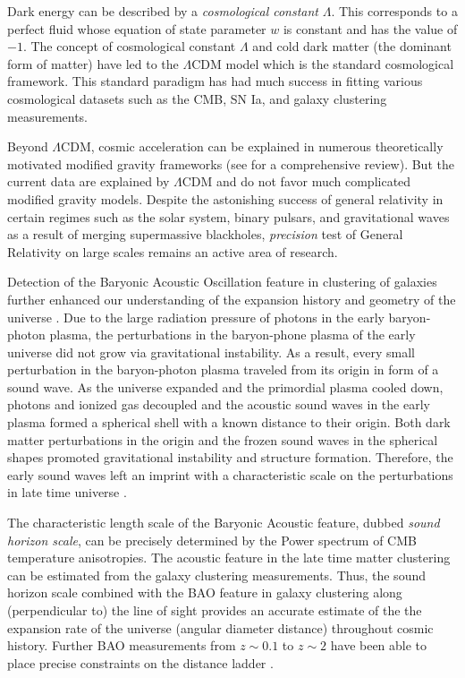 Dark energy can be described by a \emph{cosmological constant} $\Lambda$. 
This corresponds to a perfect fluid whose equation of state parameter $w$ is 
constant and has the value of $-1$. The concept of cosmological constant $\Lambda$ and 
cold dark matter (the dominant form of matter) have led to the $\Lambda$CDM model which is 
the standard cosmological framework. This standard paradigm has had much success in 
fitting various cosmological datasets such as the CMB, SN Ia, and galaxy clustering 
measurements.

Beyond $\Lambda$CDM, cosmic acceleration 
can be explained in numerous theoretically motivated modified gravity frameworks (see \citealt{bull2016} 
for a comprehensive review). But the current data are explained by $\Lambda$CDM and do not favor 
much complicated modified gravity models. 
Despite the astonishing success of general relativity in 
certain regimes such as the solar system, binary pulsars, 
and gravitational waves as a result of merging supermassive blackholes, 
\emph{precision} test of General Relativity on large scales remains an active area of research. 

Detection of the Baryonic Acoustic Oscillation feature in clustering of galaxies 
further enhanced our understanding of the expansion history and geometry of the universe \citep{cole2005,eisenstein2005}.
Due to the large radiation pressure of photons in the early baryon-photon plasma, the perturbations in the 
baryon-phone plasma of the early universe did not grow via gravitational instability. As a result, every small perturbation 
in the baryon-photon plasma traveled from its origin in form of a sound wave. 
As the universe expanded and the primordial plasma cooled down, 
photons and ionized gas decoupled and the acoustic sound waves in the early plasma formed a spherical shell 
with a known distance to their origin. Both dark matter perturbations in the origin and the frozen sound waves in 
the spherical shapes promoted gravitational instability and structure formation. Therefore, the early sound waves left an 
imprint with a characteristic scale on the perturbations in late time universe \citep{eisenstein1998,weinberg2013}.  

The characteristic length scale of the Baryonic Acoustic feature, dubbed \emph{sound horizon scale}, 
can be precisely determined by the Power spectrum of CMB temperature anisotropies. 
The acoustic feature in the late time matter clustering can be estimated from 
the galaxy clustering measurements. Thus, the sound horizon scale combined with the BAO feature in 
galaxy clustering along (perpendicular to) the line of sight provides an accurate estimate 
of the the expansion rate of the universe (angular diameter distance) throughout cosmic history. Further BAO 
measurements from $z\sim0.1$ to $z\sim 2$ have been able to place precise constraints on the distance ladder \citep{percival2010,beutler2011,anderson2014,font2014,delubac2015,ross2015,alam2016}. 
 
